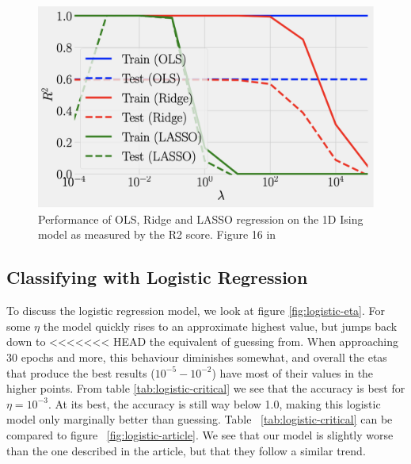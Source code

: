 \begin{figure}[H]
    \centering
\includegraphics[width = 0.6\paperwidth]{figures/R2_article.png}
\caption{Performance of OLS, Ridge and LASSO regression on the 1D Ising model as measured by the 
    R2 score. Figure 16 in \cite{HighBias}} 
\label{fig:regression-r2-article}
\end{figure}
\subsection{Classifying with Logistic Regression}
To discuss the logistic regression model, 
we look at figure \ref{fig:logistic-eta}. For some $\eta$ the model 
quickly rises to an approximate highest value, but jumps back down to 
<<<<<<< HEAD
the equivalent of guessing from. 
When approaching 30 epochs and more, this behaviour 
diminishes somewhat, and overall the etas that produce the best results 
($10^{-5} - 10^{-2}$) have most of their values in the higher points.
From table \ref{tab:logistic-critical} we see that the accuracy is best
for \(\eta = 10^{-3}\). At its best, the accuracy is still 
way below 1.0, making this logistic model only marginally better than guessing. 
Table ~\ref{tab:logistic-critical} can be compared to figure 
~\ref{fig:logistic-article}. We see that our model is slightly 
worse than the one described in the article, but that they 
follow a similar trend.


